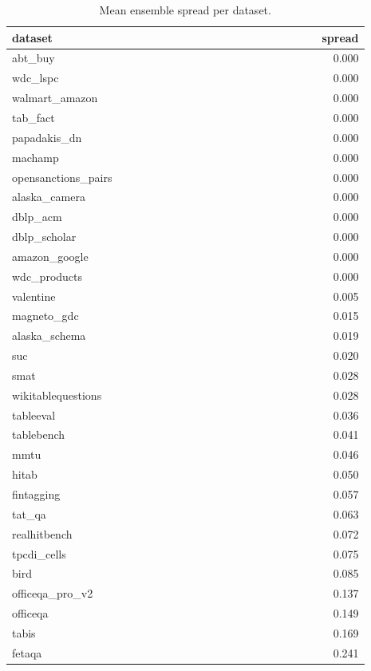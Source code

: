 \begin{table}[htbp]
\centering\scriptsize
\caption{Mean ensemble spread per dataset.}
\label{tab:ensemble_spread}
\setlength{\tabcolsep}{3pt}
\begin{tabular}{p{0.892\linewidth}r}
\toprule
dataset & spread \\
\midrule
abt\_\allowbreak{}buy & 0.000 \\
wdc\_\allowbreak{}lspc & 0.000 \\
walmart\_\allowbreak{}amazon & 0.000 \\
tab\_\allowbreak{}fact & 0.000 \\
papadakis\_\allowbreak{}dn & 0.000 \\
machamp & 0.000 \\
opensanctions\_\allowbreak{}pairs & 0.000 \\
alaska\_\allowbreak{}camera & 0.000 \\
dblp\_\allowbreak{}acm & 0.000 \\
dblp\_\allowbreak{}scholar & 0.000 \\
amazon\_\allowbreak{}google & 0.000 \\
wdc\_\allowbreak{}products & 0.000 \\
valentine & 0.005 \\
magneto\_\allowbreak{}gdc & 0.015 \\
alaska\_\allowbreak{}schema & 0.019 \\
suc & 0.020 \\
smat & 0.028 \\
wikitablequestions & 0.028 \\
tableeval & 0.036 \\
tablebench & 0.041 \\
mmtu & 0.046 \\
hitab & 0.050 \\
fintagging & 0.057 \\
tat\_\allowbreak{}qa & 0.063 \\
realhitbench & 0.072 \\
tpcdi\_\allowbreak{}cells & 0.075 \\
bird & 0.085 \\
officeqa\_\allowbreak{}pro\_\allowbreak{}v2 & 0.137 \\
officeqa & 0.149 \\
tabis & 0.169 \\
fetaqa & 0.241 \\
\bottomrule
\end{tabular}
\end{table}
